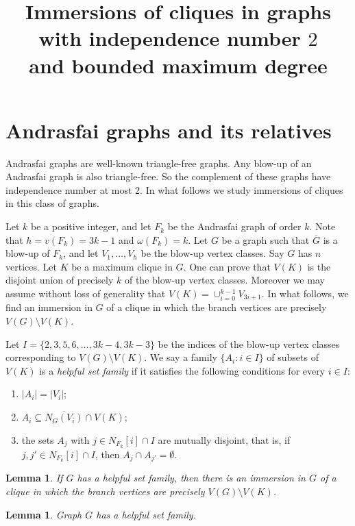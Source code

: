 \documentclass[a4paper,12pt]{article}
\title{Immersions of cliques in graphs \\ with independence number \(2\) \\ and bounded maximum degree}
\newtheorem{lemma}[theorem]{Lemma}
\begin{document}
\maketitle

\section{Andrasfai graphs and its relatives}

Andrasfai graphs are well-known triangle-free graphs. 
Any blow-up of an Andrasfai graph is also triangle-free.
So the complement of these graphs have independence number at most 2. 
In what follows we study immersions of cliques in this class of graphs. 
 
Let \(k\) be a positive integer, and let \(F_k\) be the Andrasfai graph of order $k$.
Note that \(h = v(F_k) = 3k-1\) and \(\omega(F_k) = k\).
Let \(G\) be a graph such that \(\overline{G}\) is a blow-up of \(F_k\), 
and let \(V_1,\ldots, V_h\) be the blow-up vertex classes.
Say \(G\) has \(n\) vertices.
Let \(K\) be a maximum clique in \(G\).
One can prove that \(V(K)\) is the disjoint union of precisely \(k\) of the blow-up vertex classes.
Moreover we may assume without loss of generality that \(V(K) = \cup_{i=0}^{k-1} V_{3i+1}\).
In what follows, we find an immersion in \(G\) of a clique in which the branch vertices are 
precisely \(V(G)\setminus V(K)\).

Let \(I = \{2,3,5,6,\ldots,3k-4,3k-3\}\) be the indices of the blow-up vertex classes
corresponding to \(V(G)\setminus V(K)\).
We say a family \(\{A_i: i \in I\}\) of subsets of \(V(K)\) is a \emph{helpful set family} 
if it satisfies the following conditions for every \(i \in I\):
\begin{enumerate}
\item \(|A_i| = |V_i|\);
\item \(A_i \subseteq \overline{N_G(V_i)} \cap V(K)\);
\item the sets \(A_j\) with \(j \in N_{F_k}[i]\cap I\) are mutually disjoint, 
  that is, if \(j,j' \in N_{F_k}[i] \cap I\), then \(A_j\cap A_{j'} = \emptyset\).
\end{enumerate}

\begin{lemma}
  If \(G\) has a helpful set family, then there is an immersion in \(G\) of 
  a clique in which the branch vertices are precisely \(V(G)\setminus V(K)\).
\end{lemma}

\begin{lemma}
  Graph \(G\) has a helpful set family. 
\end{lemma}
\end{document}
